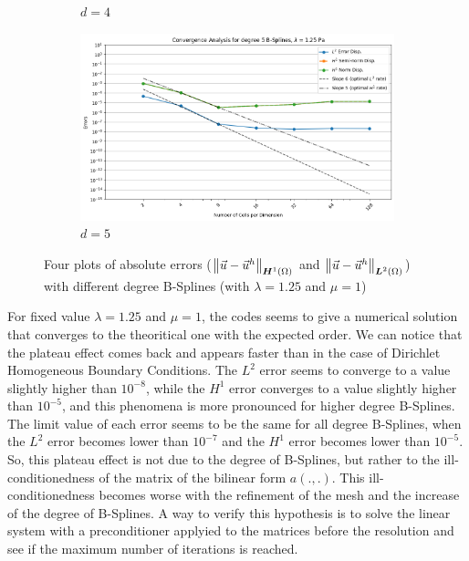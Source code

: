 \documentclass[a4paper,12pt,twoside]{report}
\begin{document}
\begin{figure}[!h]
\begin{subfigure}[b]{0.49\textwidth}
		\caption{$d=4$}
		\label{fig:deg4_NM}
	\end{subfigure}
	\begin{subfigure}[b]{0.49\textwidth}
		\centering
		\includegraphics[width=\textwidth]{figures/figures_non_mixed/convergence_plot_degree_5_lambda=1.25.png}
		\caption{$d=5$}
		\label{fig:deg5_NM}
	\end{subfigure}
	\caption{Four plots of absolute errors ($\norm{\vec u - \vec u^h}_{\boldsymbol H^1(\Omega)}$ and $\norm{\vec u - \vec u^h}_{\boldsymbol L^2(\Omega)}$) with different degree B-Splines (with $\lambda = 1.25$ and $\mu = 1$)}
	\label{fig:four_errors_graphs}
\end{figure}

For fixed value $\lambda = 1.25$ and $\mu = 1$, the codes seems to give a numerical solution that converges to the theoritical one with the expected order. We can notice that the plateau effect comes back and appears faster than in the case of Dirichlet Homogeneous Boundary Conditions. The $L^2$ error seems to converge to a value slightly higher than $10^{-8}$, while the $H^1$ error converges to a value slightly higher than $10^{-5}$, and this phenomena is more pronounced for higher degree B-Splines. The limit value of each error seems to be the same for all degree B-Splines, when the $L^2$ error becomes lower than $10^{-7}$ and the $H^1$ error becomes lower than $10^{-5}$. So, this plateau effect is not due to the degree of B-Splines, but rather to the ill-conditionedness of the matrix of the bilinear form $a(.,.)$. This ill-conditionedness becomes worse with the refinement of the mesh and the increase of the degree of B-Splines. A way to verify this hypothesis is to solve the linear system with a preconditioner applyied to the matrices before the resolution and see if the maximum number of iterations is reached.
\end{document}

